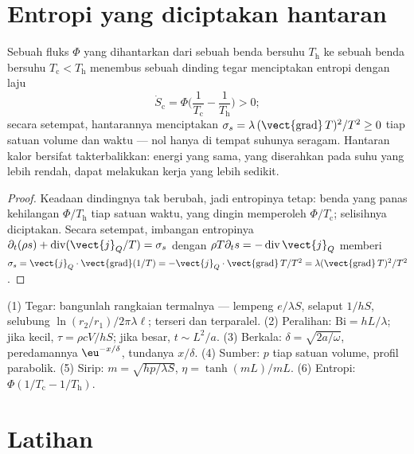 \section{Entropi yang diciptakan hantaran}

\begin{proposition}\label{prop:b2:heat-conduction:entropy}
Sebuah fluks $\Phi$ yang dihantarkan dari sebuah benda bersuhu $T_{\text{h}}$ ke sebuah benda bersuhu
$T_{\text{c}} < T_{\text{h}}$ menembus sebuah dinding tegar menciptakan entropi dengan
laju
\[
\dot S_{\text{c}} = \Phi\Big(\frac{1}{T_{\text{c}}} - \frac{1}{T_{\text{h}}}\Big) > 0 ;
\]
secara setempat, hantarannya menciptakan $\sigma_s = \lambda\,(\vect{\operatorname{grad}}\,T)^2/T^2
\ge 0$ tiap satuan volume dan waktu --- nol hanya di tempat suhunya
seragam. Hantaran kalor bersifat takterbalikkan: energi yang sama, yang diserahkan pada
suhu yang lebih rendah, dapat melakukan kerja yang lebih sedikit.
\end{proposition}

\begin{proof}
Keadaan dindingnya tak berubah, jadi entropinya tetap: benda yang
panas kehilangan $\Phi/T_{\text{h}}$ tiap satuan waktu, yang dingin memperoleh
$\Phi/T_{\text{c}}$; selisihnya diciptakan. Secara setempat, imbangan
entropinya $\partial_t(\rho s) + \operatorname{div}(\vect{j}_Q/T) = \sigma_s$
dengan $\rho T\partial_t s = -\operatorname{div}\vect{j}_Q$ memberi $\sigma_s =
\vect{j}_Q\cdot\vect{\operatorname{grad}}(1/T) = -\vect{j}_Q\cdot
\vect{\operatorname{grad}}\,T/T^2 = \lambda(\vect{\operatorname{grad}}\,T)^2/T^2$.
\end{proof}

\begin{method}\label{meth:b2:heat-conduction:method}
(1) Tegar: bangunlah rangkaian termalnya --- lempeng $e/\lambda S$, selaput
$1/hS$, selubung $\ln(r_2/r_1)/2\pi\lambda\ell$; terseri dan terparalel.
(2) Peralihan: $\mathrm{Bi} = hL/\lambda$; jika kecil, $\tau = \rho cV/hS$; jika
besar, $t \sim L^2/a$. (3) Berkala: $\delta = \sqrt{2a/\omega}$, peredamannya
$\eu^{-x/\delta}$, tundanya $x/\delta$. (4) Sumber: $p$ tiap satuan volume, profil
parabolik. (5) Sirip: $m = \sqrt{hp/\lambda S}$, $\eta = \tanh(mL)/mL$. (6)
Entropi: $\Phi(1/T_{\text{c}} - 1/T_{\text{h}})$.
\end{method}

\section{Latihan}

